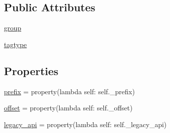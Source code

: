 \subsection*{Public Attributes}
\begin{DoxyCompactItemize}
\item 
\hyperlink{classPIL_1_1TiffImagePlugin_1_1ImageFileDirectory__v2_a6d657459b9e6de6a30e661c8dbd1e5f8}{group}
\item 
\hyperlink{classPIL_1_1TiffImagePlugin_1_1ImageFileDirectory__v2_a040a5d4a2a22a41d93af84b8f156c2e2}{tagtype}
\end{DoxyCompactItemize}
\subsection*{Properties}
\begin{DoxyCompactItemize}
\item 
\hyperlink{classPIL_1_1TiffImagePlugin_1_1ImageFileDirectory__v2_ab19686806aa3bb80dc576b47dd8f2194}{prefix} = property(lambda self\+: self.\+\_\+prefix)
\item 
\hyperlink{classPIL_1_1TiffImagePlugin_1_1ImageFileDirectory__v2_a556b82fbafe8a4f39d3c3f5bcf232d61}{offset} = property(lambda self\+: self.\+\_\+offset)
\item 
\hyperlink{classPIL_1_1TiffImagePlugin_1_1ImageFileDirectory__v2_a1255938aff28089f025f0c26529d0f63}{legacy\+\_\+api} = property(lambda self\+: self.\+\_\+legacy\+\_\+api)
\end{DoxyCompactItemize}


